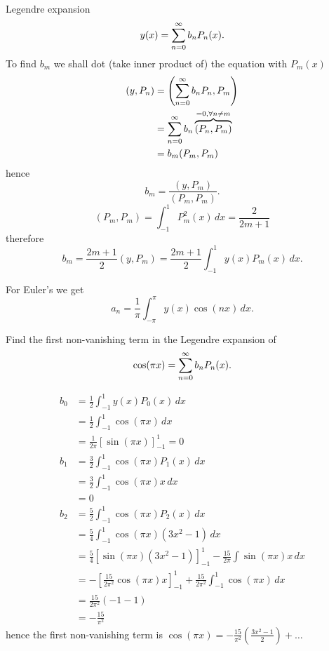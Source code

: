 \documentclass[10pt, a4paper]{article}
\begin{document}
Legendre expansion
\[
y(x) = \infsum[n = 0]b_nP_n(x).
\]
To find $b_m$ we shall dot
(take inner product of)
the equation with $P_m(x)$
\begin{align*}
    (y, P_n) &= \left(\infsum[n = 0]b_nP_n, P_m\right) \\
    &= \infsum[n = 0]b_n\overbrace{(P_n, P_m)}^{=0, \forall n\neq m} \\
    &= b_m(P_m, P_m)
\end{align*}
hence
\[
b_m = \frac{(y, P_m)}{(P_m, P_m)}.
\]
\[
(P_m, P_m) = \int_{-1}^{1}P_m ^ 2(x)\,dx = \frac{2}{2m + 1}
\]
therefore
\[
b_m = \frac{2m + 1}{2}(y, P_m) = \frac{2m + 1}{2}\int_{-1}^{1}y(x)P_m(x)\,dx.
\]

For Euler's we get
\[
a_n = \frac{1}{\pi}\int_{-\pi}^{\pi}y(x)\cos(nx)\,dx.
\]

\begin{example}
    Find the first non-vanishing term in the Legendre expansion of
    \[
    \cos(\pi x) = \infsum[n = 0] b_nP_n(x).
    \]
    
    \begin{solution}
        \begin{align*}
            b_0 &= \frac{1}{2}\int_{-1}^{1}y(x)P_0(x)\,dx \\
            &= \frac{1}{2}\int_{-1}^{1}\cos(\pi x)\,dx \\
            &= \frac{1}{2\pi}[\sin(\pi x)]_{-1}^{1} = 0 \\
            b_1 &= \frac{3}{2}\int_{-1}^{1}\cos(\pi x)P_1(x)\,dx \\
            &= \frac{3}{2}\int_{-1}^{1}\cos(\pi x)x\,dx \\
            &= 0 \\
            b_2 &= \frac{5}{2}\int_{-1}^{1}\cos(\pi x)P_2(x)\,dx \\
            &= \frac{5}{4}\int_{-1}^{1}\cos(\pi x)(3x ^ 2 - 1)\,dx \\
            &= \frac{5}{4}\left[\sin(\pi x)(3x ^ 2 - 1)\right]_{-1}^{1} - \frac{15}{2\pi}\int\sin(\pi x)x\,dx \\
            &= -\left[\frac{15}{2\pi ^ 2}\cos(\pi x)x\right]_{-1}^{1} + \frac{15}{2\pi ^ 2}\int_{-1}^{1}\cos(\pi x)\,dx \\
            &= \frac{15}{2\pi ^ 2}(-1 - 1) \\
            &= -\frac{15}{\pi ^ 2}
        \end{align*}
        hence the first non-vanishing term is $\cos(\pi x) = -\frac{15}{\pi ^ 2}\left(\frac{3x ^ 2 - 1}{2}\right) + \dotsc$
    \end{solution}
\end{example}
\end{document}
